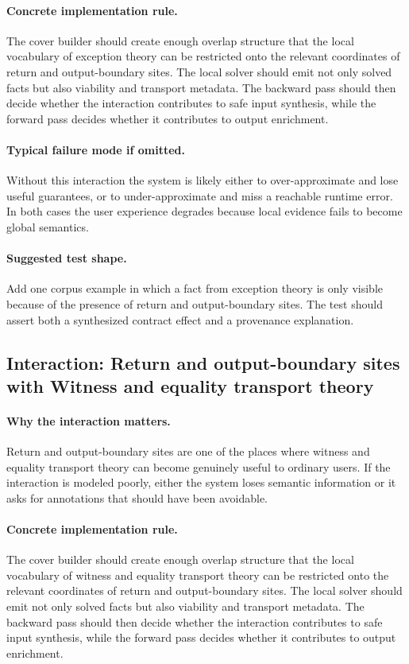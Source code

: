 \documentclass[11pt]{report}
\theoremstyle{definition}
\theoremstyle{plain}
\begin{document}
\paragraph{Concrete implementation rule.}
The cover builder should create enough overlap structure that the local
vocabulary of exception theory can be restricted onto the relevant
coordinates of return and output-boundary sites. The local solver should emit not only
solved facts but also viability and transport metadata. The backward pass
should then decide whether the interaction contributes to safe input
synthesis, while the forward pass decides whether it contributes to output
enrichment.

\paragraph{Typical failure mode if omitted.}
Without this interaction the system is likely either to over-approximate and
lose useful guarantees, or to under-approximate and miss a reachable runtime
error. In both cases the user experience degrades because local evidence
fails to become global semantics.

\paragraph{Suggested test shape.}
Add one corpus example in which a fact from exception theory is only
visible because of the presence of return and output-boundary sites. The test should
assert both a synthesized contract effect and a provenance explanation.

\subsection{Interaction: Return and output-boundary sites with Witness and equality transport theory}

\paragraph{Why the interaction matters.}
Return and output-boundary sites are one of the places where witness and equality transport theory can become
genuinely useful to ordinary users. If the interaction is modeled poorly,
either the system loses semantic information or it asks for annotations that
should have been avoidable.

\paragraph{Concrete implementation rule.}
The cover builder should create enough overlap structure that the local
vocabulary of witness and equality transport theory can be restricted onto the relevant
coordinates of return and output-boundary sites. The local solver should emit not only
solved facts but also viability and transport metadata. The backward pass
should then decide whether the interaction contributes to safe input
synthesis, while the forward pass decides whether it contributes to output
enrichment.
\end{document}
